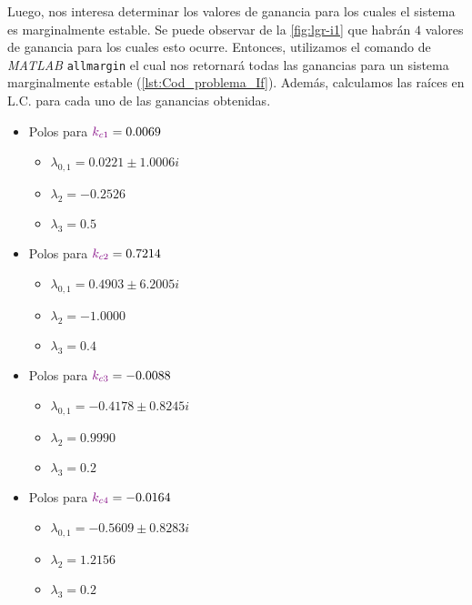 Luego, nos interesa determinar los valores de ganancia para los cuales el sistema
es marginalmente estable. Se puede observar de la \autoref{fig:lgr-i1} que habrán
$4$ valores de ganancia para los cuales esto ocurre. Entonces, utilizamos el comando
de \textit{MATLAB} \verb|allmargin| el cual nos retornará todas las ganancias
para un sistema marginalmente estable (\autoref{lst:Cod_problema_If}). Además,
calculamos las raíces en L.C. para cada uno de las ganancias obtenidas.

\begin{multicols}{2}
  \begin{itemize}
  \item Polos para \(\mathbin{\color{violet}k_{c1}} = 0.0069\)
    \begin{itemize}
      \item $\lambda_{0,1} =0.0221 \pm 1.0006i$
      \item $\lambda_{2} = -0.2526$
      \item $\lambda_{3} = 0.5$
    \end{itemize}

  \item Polos para \(\mathbin{\color{violet}k_{c2}} = 0.7214\)
    \begin{itemize}
      \item $\lambda_{0,1} = 0.4903 \pm 6.2005i$
      \item $\lambda_{2} = -1.0000$
      \item $\lambda_{3} = 0.4$
    \end{itemize}

  \columnbreak

  \item Polos para \(\mathbin{\color{violet}k_{c3}} = -0.0088\)
    \begin{itemize}
      \item $\lambda_{0,1} = -0.4178 \pm 0.8245i$
      \item $\lambda_{2} = 0.9990$
      \item $\lambda_{3} = 0.2$
    \end{itemize}

  \item Polos para \(\mathbin{\color{violet}k_{c4}} = -0.0164\)
    \begin{itemize}
      \item $\lambda_{0,1} = -0.5609 \pm 0.8283i$
      \item $\lambda_{2} = 1.2156 $
      \item $\lambda_{3} = 0.2$
    \end{itemize}
  \end{itemize}
\end{multicols}

